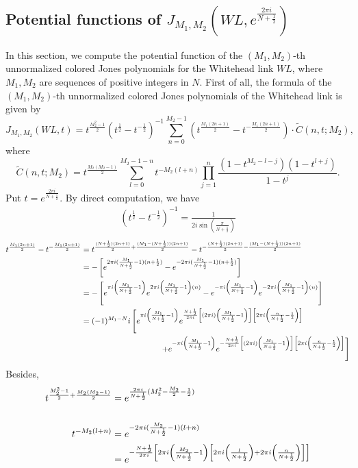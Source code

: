 \documentclass[10pt,a4paper]{article}
\newcommand{\lt}{\left}
\newcommand{\rt}{\right}
\begin{document}
\subsection{Potential functions of $J_{M_1,M_2}(WL,e^{\frac{2\pi i}{N+\frac{1}{2}}})$}
In this section, we compute the potential function of the $(M_1,M_2)$-th unnormalized colored Jones polynomials for the Whitehead link $WL$, where $M_1,M_2$ are sequences of positive integers in $N$. First of all, the formula of the $(M_1,M_2)$-th unnormalized colored Jones polynomials of the Whitehead link is given by \cite{HZ07}
$$ J_{M_1,M_2} (WL, t) = t^{\frac{M_2^2-1}{2}} (t^{\frac{1}{2}}-t^{-\frac{1}{2}})^{-1}\sum_{n=0}^{M_2-1} (t^{\frac{M_1(2n+1)}{2}}-t^{-\frac{M_1(2n+1)}{2}})  \cdot \tilde{C}(n,t; M_2) ,$$
where 
$$\tilde{C}(n,t; M_2) = t^{\frac{M_2(M_2-1)}{2}} \sum_{l = 0}^{M_2-1-n} t^{-M_2(l+n)} \prod_{j=1}^{n} \frac{(1-t^{M_2-l-j})(1-t^{l+j})}{1-t^j}.$$
Put $t = e^{\frac{2\pi i}{N+\frac{1}{2}}}$. By direct computation, we have
\begin{align}\label{t0}
 (t^{\frac{1}{2}}-t^{-\frac{1}{2}})^{-1} = \frac{1}{2i\sin\lt(\frac{\pi}{N+\frac{1}{2}}\rt)}
\end{align}
\begin{align}
 t^{\frac{M_1(2n+1)}{2}}-t^{-\frac{M_1(2n+1)}{2}} 
&= t^{\frac{(N+\frac{1}{2})(2n+1)}{2} + \frac{(M_1 - (N+\frac{1}{2}))(2n+1)}{2}} - t^{-\frac{(N+\frac{1}{2})(2n+1)}{2} - \frac{(M_1 - (N+\frac{1}{2}))(2n+1)}{2}}  \notag \\
&= -\lt[ e^{2\pi i(\frac{M_1}{N+\frac{1}{2}} -1) (n+\frac{1}{2})} - e^{-2\pi i (\frac{M_1}{N+\frac{1}{2}} -1)(n+\frac{1}{2})} \rt]  \notag \\
&= -\lt[ e^{\pi i\lt(\frac{M_1}{N+\frac{1}{2}}-1\rt)}e^{2\pi i\lt(\frac{M_1}{N+\frac{1}{2}} -1\rt) (n)} - e^{-\pi i\lt(\frac{M_1}{N+\frac{1}{2}}-1\rt)}e^{-2\pi i \lt(\frac{M_1}{N+\frac{1}{2}} -1\rt)(n)} \rt]  \notag \\
&= (-1)^{M_1 - N}i\lt[ e^{\pi i\lt(\frac{M_1}{N+\frac{1}{2}}-1\rt)}e^{\frac{N+\frac{1}{2}}{2\pi i}\lt[(2\pi i)\lt(\frac{M_1}{N+\frac{1}{2}} -1\rt)\rt] \lt[2\pi i \lt(\frac{n}{N+\frac{1}{2}}-\frac{1}{2}\rt)\rt]} \rt. \notag\\
&\qquad\qquad\qquad\qquad\qquad \lt. + e^{-\pi i\lt(\frac{M_1}{N+\frac{1}{2}}-1\rt)}e^{-\frac{N+\frac{1}{2}}{2\pi i}\lt[(2\pi i)\lt(\frac{M_1}{N+\frac{1}{2}} -1\rt)\rt] \lt[2\pi i \lt(\frac{n}{N+\frac{1}{2}}-\frac{1}{2}\rt)\rt]} \rt]
\label{t1}
\end{align}
Besides,
\begin{align}
t^{\frac{M_2^2 - 1}{2} + \frac{M_2(M_2-1)}{2}}
&= e^{\frac{2\pi i}{N+\frac{1}{2}}(M_2^2 - \frac{M_2}{2} - \frac{1}{2})} 
\\\notag\\
t^{-M_2(l+n)} 
&=  e^{-2\pi i (\frac{M_2}{N+\frac{1}{2}}-1) (l+n)} \notag \\
&= e^{- \frac{N+\frac{1}{2}}{2\pi i} \lt[ 2\pi i \lt(\frac{M_2}{N+\frac{1}{2}} -1 \rt) \lt[ 2\pi i \lt(\frac{l}{N+\frac{1}{2}}\rt) + 2\pi i \lt( \frac{n}{N+\frac{1}{2}}\rt) \rt] \rt]} \label{t5}
\end{align}
\end{document}
